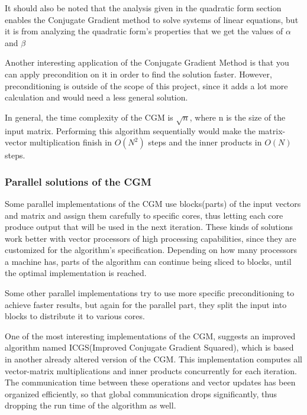\documentclass[12pt,twosided]{article}
\begin{document}
It should also be noted that the analysis given in the quadratic form section enables the Conjugate Gradient method to solve systems of linear equations, but it is from analyzing the quadratic form's properties that we get the values of $\alpha$ and $\beta$\cite{press2007numerical}\cite{shewchuk1994introduction}\cite{cgm2009lec}

Another interesting application of the Conjugate Gradient Method is that you can apply precondition on it in order to find the solution faster. However, preconditioning is outside of the scope of this project, since it adds a lot more calculation and would need a less general solution.

In general, the time complexity of the CGM is $\sqrt{n}$, where n is the size of the input matrix. Performing this algorithm sequentially would make the matrix-vector multiplication finish in $O(N^2)$ steps and the inner products in $O(N)$ steps.
\subsubsection{Parallel solutions of the CGM}

Some parallel implementations of the CGM use blocks(parts) of the input vectors and matrix and assign them carefully to specific cores, thus letting each core produce output that will be used in the next iteration. These kinds of solutions work better with vector processors of high processing capabilities, since they are customized for the algorithm's specification. Depending on how many processors a machine has, parts of the algorithm can continue being sliced to blocks, until the optimal implementation is reached\cite{o1987parallel}.

Some other parallel implementations try to use more specific preconditioning to achieve faster results, but again for the parallel part, they split the input into blocks to distribute it to various cores\cite{adams1985m}\cite{adams1983m}. 

One of the most interesting implementations of the CGM, suggests an improved algorithm named ICGS(Improved Conjugate Gradient Squared), which is based in another already altered version of the CGM\cite{maheswaran1999mcgs}. This implementation computes all vector-matrix  multiplications and inner products concurrently for each iteration. The communication time between these operations and vector updates has been organized efficiently, so that global communication drops significantly, thus dropping the run time of the algorithm as well\cite{yang2001improved}.
\end{document}

